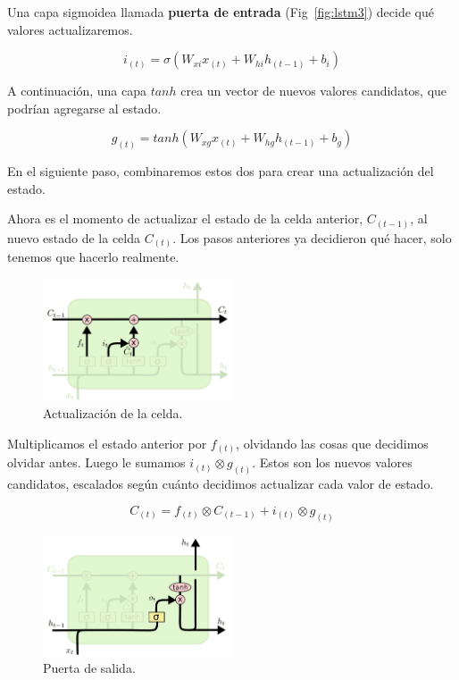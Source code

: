 \documentclass[a4paper,12pt]{article}
\begin{document}
Una capa sigmoidea llamada \textbf{puerta de entrada} (Fig~\ref{fig:lstm3}) decide qué valores actualizaremos.

$$i_{(t)}=\sigma(W_{xi}x_{(t)} + W_{hi}h_{(t-1)} + b_i)$$

A continuación, una capa $tanh$ crea un vector de nuevos valores candidatos, que podrían agregarse al estado. 

$$g_{(t)}=tanh(W_{xg}x_{(t)}+W_{hg}h_{(t-1)}+b_g)$$


En el siguiente paso, combinaremos estos dos para crear una actualización del estado.

Ahora es el momento de actualizar el estado de la celda anterior, $C_{(t-1)}$, al nuevo estado de la celda $C_{(t)}$. Los pasos anteriores ya decidieron qué hacer, solo tenemos que hacerlo realmente.

\begin{figure}[H]
	\begin{center}				
	\includegraphics[width=0.5\textwidth]{lstm4.png}
  	\caption{Actualización de la celda.}
  	\label{fig:lstm4}
  	\end{center}
\end{figure}

Multiplicamos el estado anterior por $f_{(t)}$, olvidando las cosas que decidimos olvidar antes. Luego le sumamos $i_{(t)} \otimes g_{(t)}$. Estos son los nuevos valores candidatos, escalados según cuánto decidimos actualizar cada valor de estado.

$$C_{(t)} = f_{(t)} \otimes C_{(t-1)} + i_{(t)} \otimes g_{(t)}$$

\begin{figure}[H]
	\begin{center}				
	\includegraphics[width=0.5\textwidth]{lstm5.png}
  	\caption{Puerta de salida.}
  	\label{fig:lstm5}
  	\end{center}
\end{figure}
\end{document}

